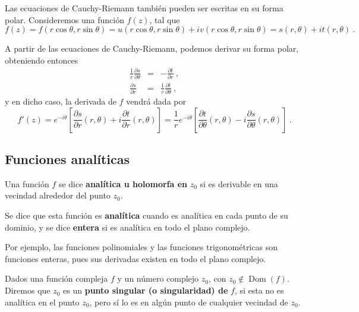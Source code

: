Las ecuaciones de Cauchy-Riemann también pueden ser escritas en su forma polar. Consideremos una función $f(z)$, tal que
\begin{equation*}
    f(z) = f(r \cos \theta, r \sin \theta) = u(r \cos \theta, r \sin \theta) + i v(r \cos \theta, r \sin \theta) = s(r, \theta) + i t(r, \theta) \ .
\end{equation*}

A partir de las ecuaciones de Cauchy-Riemann, podemos derivar su forma polar, obteniendo entonces
\begin{equation}
    \begin{array}{ccc}
        \frac{1}{r} \frac{\partial s}{\partial \theta} & = & - \frac{\partial t}{\partial r} \ , \\
        \frac{\partial s}{\partial r} & = & \frac{1}{r} \frac{\partial t}{\partial \theta} \ , 
    \end{array}
\end{equation}
y en dicho caso, la derivada de $f$ vendrá dada por
\begin{equation}
    f'(z) = e^{-i\theta} \left[ \frac{\partial s}{\partial r}(r, \theta) + i \frac{\partial t}{\partial r}(r, \theta) \right] = \frac{1}{r} e^{-i\theta} \left[ \frac{\partial t}{\partial \theta}(r, \theta) - i \frac{\partial s}{\partial \theta}(r, \theta) \right] \ .
\end{equation}

\subsection{Funciones analíticas}

\begin{defi}
    Una función $f$ se dice \textbf{analítica u holomorfa en} $z_0$ si es derivable en una vecindad alrededor del punto $z_0$. 

    Se dice que esta función es \textbf{analítica} cuando es analítica en cada punto de su dominio, y se dice \textbf{entera} si es analítica en todo el plano complejo.
\end{defi}

Por ejemplo, las funciones polinomiales y las funciones trigonométricas son funciones enteras, pues sus derivadas existen en todo el plano complejo.

\begin{defi} 
    Dados una función compleja $f$ y un número complejo $z_0$, con $z_0 \notin \operatorname{Dom}(f)$. Diremos que $z_0$ es un \textbf{punto singular (o singularidad) de} $f$, si esta no es analítica en el punto $z_0$, pero sí lo es en algún punto de cualquier vecindad de $z_0$.
\end{defi} 

